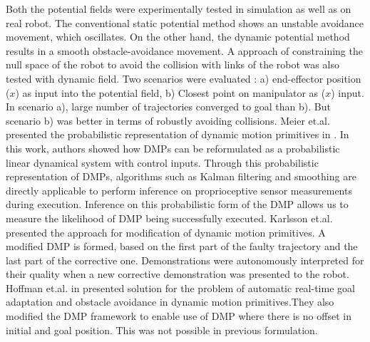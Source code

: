 Both the potential fields were experimentally tested in simulation as well as on real robot.  
The conventional static potential method shows an unstable avoidance movement, which oscillates. On the other hand, the dynamic potential method results in a smooth obstacle-avoidance movement.
A approach of constraining the null space of the robot to avoid the collision with links of the robot was also tested with dynamic field. Two scenarios were evaluated : a) end-effector position ($x$) as input into the potential field, b) Closest point on manipulator as ($x$) input. In scenario a), large number of trajectories converged to goal than b). But scenario b) was better in terms of robustly avoiding collisions.  
\newline
Meier et.al. presented the probabilistic representation of dynamic motion primitives in \cite{meier2016probabilistic}. In this work, authors showed how DMPs can be reformulated as a probabilistic linear dynamical system with control inputs. Through this probabilistic representation of DMPs, algorithms such as Kalman filtering and smoothing are directly applicable to perform inference on proprioceptive sensor measurements during execution. Inference on this probabilistic form of the DMP allows us to measure the likelihood of DMP being successfully executed. 
\newline
Karlsson et.al.\cite{karlsson2017autonomous} presented the approach for modification of dynamic motion primitives. A modified DMP is formed, based on the first part of the faulty trajectory and the last part of the corrective one. Demonstrations were autonomously interpreted for their quality when a new corrective demonstration was presented to the robot. 
\newline
Hoffman et.al. in \cite{hoffmann2009biologically} presented solution for the problem of automatic real-time goal adaptation and obstacle avoidance in dynamic motion primitives.They also modified the DMP framework to enable use of DMP where there is no offset in initial and goal position. This was not possible in previous formulation.



